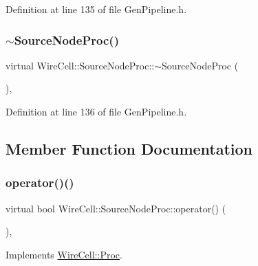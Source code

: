 Definition at line 135 of file Gen\+Pipeline.\+h.

\mbox{\label{class_wire_cell_1_1_source_node_proc_a0357127656bfc3658cc63514753ae323}} 
\subsubsection{\texorpdfstring{$\sim$\+Source\+Node\+Proc()}{~SourceNodeProc()}}
{\footnotesize\ttfamily virtual Wire\+Cell\+::\+Source\+Node\+Proc\+::$\sim$\+Source\+Node\+Proc (\begin{DoxyParamCaption}{ }\end{DoxyParamCaption})\hspace{0.3cm}{\ttfamily [inline]}, {\ttfamily [virtual]}}



Definition at line 136 of file Gen\+Pipeline.\+h.



\subsection{Member Function Documentation}
\mbox{\label{class_wire_cell_1_1_source_node_proc_abd977752a7aa067206eea94ac69c940a}} 
\subsubsection{\texorpdfstring{operator()()}{operator()()}}
{\footnotesize\ttfamily virtual bool Wire\+Cell\+::\+Source\+Node\+Proc\+::operator() (\begin{DoxyParamCaption}{ }\end{DoxyParamCaption})\hspace{0.3cm}{\ttfamily [inline]}, {\ttfamily [virtual]}}



Implements \hyperlink{class_wire_cell_1_1_proc_a9c642ed1f6b6741633c6cb1bd063b502}{Wire\+Cell\+::\+Proc}.



